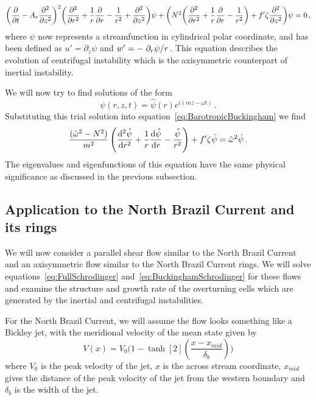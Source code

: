 \begin{equation}
    \label{eq:BarotropicBuckingham}
    \bigg(\pdv{}{t} - A_r \pdv[2]{}{z} \bigg)^2 \bigg(\pdv[2]{}{r} + \frac{1}{r}\pdv{}{r} - \frac{1}{r^2} + \pdv[2]{}{z} \bigg) \psi + \bigg( N^2 \bigg(\pdv[2]{}{r} + \frac{1}{r}\pdv{}{r} - \frac{1}{r^2}\bigg) + f' \zeta \pdv[2]{}{z} \bigg) \psi = 0 \, ,
\end{equation}
where $\psi$ now represents a streamfunction in cylindrical polar coordinate, and has been defined as $u' = \partial_z \psi$ and $w' = - \flatfrac{\partial_r \psi}{r}$. This equation describes the evolution of centrifugal instability which is the axisymmetric counterpart of inertial instability.

We will now try to find solutions of the form
\begin{equation}
    \psi(r, z, t) = \hat{\psi}(r) e^{i(mz - \omega t)} \, .
\end{equation}
Substituting this trial solution into equation~\ref{eq:BarotropicBuckingham} we find
\begin{equation}
    \frac{(\hat{\omega}^2 - N^2 )}{m^2}\, \Bigg(\dv[2]{\hat{\psi}}{r} + \frac{1}{r} \dv{\hat{\psi}}{r} - \frac{\hat{\psi}}{r^2}\Bigg) + f' \zeta \hat{\psi} = \hat{\omega}^2 \hat{\psi}\, .
    \label{eq:BuckinghamSchrodinger}
\end{equation}
The eigenvalues and eigenfunctions of this equation have the same physical significance as discussed in the previous subsection.



\subsection{Application to the North Brazil Current and its rings}
We will now consider a parallel shear flow similar to the North Brazil Current and an axisymmetric flow similar to the North Brazil Current rings. We will solve equations~\ref{eq:FullSchrodinger} and~\ref{eq:BuckinghamSchrodinger} for these flows and examine the structure and growth rate of the overturning cells which are generated by the inertial and centrifugal instabilities.

For the North Brazil Current, we will assume the flow looks something like a Bickley jet, with the meridional velocity of the mean state given by
\begin{equation}
    V(x) = V_0 \Bigg( 1 - \tanh[2](\frac{x - x_{mid}}{\delta_b})\Bigg)
\end{equation}
where $V_0$ is the peak velocity of the jet, $x$ is the across stream coordinate, $x_{mid}$ gives the distance of the peak velocity of the jet from the western boundary and $\delta_b$ is the width of the jet.

